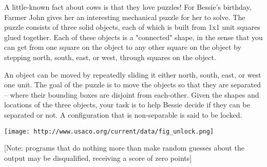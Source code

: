 A little-known fact about cows is that they love puzzles! For Bessie's birthday, Farmer John gives her an interesting mechanical puzzle for her to solve.  The puzzle consists of three solid objects, each of which is built from 1x1 unit squares glued together.  Each of these objects is a "connected" shape,  in the sense that you can get from one square on the object to any other square on the object by stepping north, south, east, or west, through squares on the object.

An object can be moved by repeatedly sliding it either north, south, east, or west one unit.  The goal of the puzzle is to move the objects so that they are separated -- where their bounding boxes are disjoint from each-other.  Given the shapes and locations of the three objects, your task is to help Bessie decide if they can be separated or not. A configuration that is non-separable is said to be locked.


\texttt{[image: http://www.usaco.org/current/data/fig\_unlock.png]}

[Note: programs that do nothing more than make random guesses about the output may be disqualified, receiving a score of zero points]